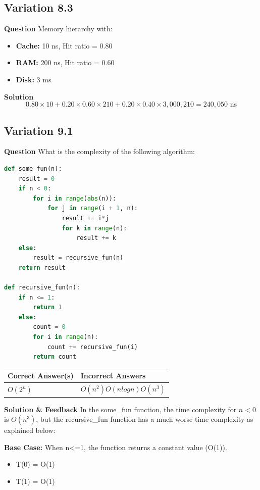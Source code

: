 \subsection{Variation 8.3}
\textbf{Question}
Memory hierarchy with:
\begin{itemize}[leftmargin=*]
    \item \textbf{Cache:} 10 ns, Hit ratio = 0.80
    \item \textbf{RAM:} 200 ns, Hit ratio = 0.60
    \item \textbf{Disk:} 3 ms
\end{itemize}

\textbf{Solution}
\[
0.80 \times 10 + 0.20 \times 0.60 \times 210 + 0.20 \times 0.40 \times 3,000,210 = 240,050 \text{ ns}
\]

\subsection{Variation 9.1}
\textbf{Question}
What is the complexity of the following algorithm:

\begin{lstlisting}[language=Python]
def some_fun(n):
    result = 0
    if n < 0:
        for i in range(abs(n)):
            for j in range(i + 1, n):
                result += i*j
                for k in range(n):
                    result += k
    else:
        result = recursive_fun(n)
    return result

def recursive_fun(n):
    if n <= 1:
        return 1
    else:
        count = 0
        for i in range(n):
            count += recursive_fun(i)
        return count
\end{lstlisting}

\begin{center}
\begin{tabular}{|l|l|}
\hline
\textbf{Correct Answer(s)} & \textbf{Incorrect Answers} \\
\hline
$O(2^n)$ & $O(n^2) O(nlogn) O(n^3)$ \\
\hline
\end{tabular}
\end{center}

\textbf{Solution \& Feedback}
In the some\_fun function, the time complexity for $n<0$ is $O(n^3)$, but the recursive\_fun function has a much worse time complexity as explained below:

\textbf{Base Case:} When n<=1, the function returns a constant value (O(1)).
\begin{itemize}
\item T(0) = O(1)
\item T(1) = O(1)
\end{itemize}

